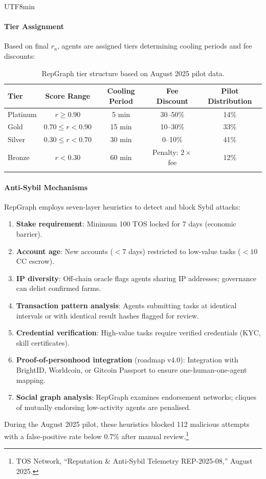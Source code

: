 \documentclass[11pt]{article}
\begin{document}
\begin{CJK}{UTF8}{min}
\paragraph{Tier Assignment} Based on final $r_a$, agents are assigned tiers determining cooling periods and fee discounts:
\begin{longtable}{@{}lcccc@{}}
\toprule
\textbf{Tier} & \textbf{Score Range} & \textbf{Cooling Period} & \textbf{Fee Discount} & \textbf{Pilot Distribution} \\\midrule
Platinum & $r \geq 0.90$ & 5 min & 30--50\% & 14\% \\
Gold & $0.70 \leq r < 0.90$ & 15 min & 10--30\% & 33\% \\
Silver & $0.30 \leq r < 0.70$ & 30 min & 0--10\% & 41\% \\
Bronze & $r < 0.30$ & 60 min & Penalty: $2 \times$ fee & 12\% \\\bottomrule
\caption{RepGraph tier structure based on August 2025 pilot data.}
\label{tab:reputation-tiers}
\end{longtable}

\paragraph{Anti-Sybil Mechanisms} RepGraph employs seven-layer heuristics to detect and block Sybil attacks:
\begin{enumerate}[noitemsep]
  \item \textbf{Stake requirement}: Minimum 100 TOS locked for 7 days (economic barrier).
  \item \textbf{Account age}: New accounts ($<7$ days) restricted to low-value tasks ($<10$ CC escrow).
  \item \textbf{IP diversity}: Off-chain oracle flags agents sharing IP addresses; governance can delist confirmed farms.
  \item \textbf{Transaction pattern analysis}: Agents submitting tasks at identical intervals or with identical result hashes flagged for review.
  \item \textbf{Credential verification}: High-value tasks require verified credentials (KYC, skill certificates).
  \item \textbf{Proof-of-personhood integration} (roadmap v4.0): Integration with BrightID, Worldcoin, or Gitcoin Passport to ensure one-human-one-agent mapping.
  \item \textbf{Social graph analysis}: RepGraph examines endorsement networks; cliques of mutually endorsing low-activity agents are penalised.
\end{enumerate}
During the August 2025 pilot, these heuristics blocked 112 malicious attempts with a false-positive rate below 0.7\% after manual review.\footnote{TOS Network, ``Reputation \& Anti-Sybil Telemetry REP-2025-08,'' August 2025.}


\end{CJK}
\end{document}
